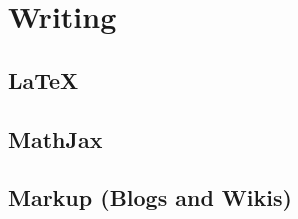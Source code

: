  
\chapter{Writing}


\section{LaTeX}
\label{sec:latex}


\section{MathJax}
\label{sec:mathjax}

\section{Markup (Blogs and Wikis)}
\label{sec:markup}

